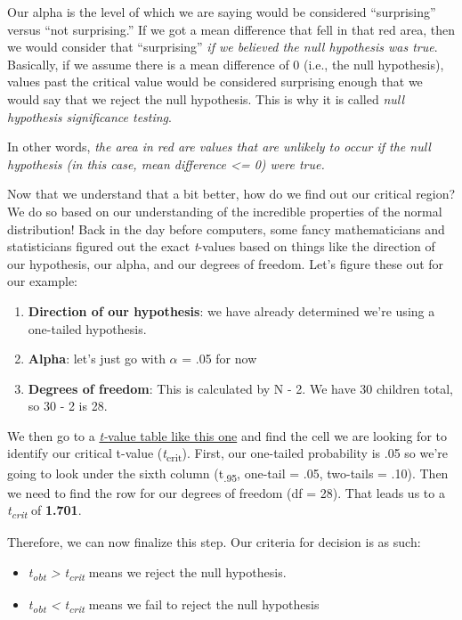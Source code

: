 \documentclass[
]{book}
\providecommand{\tightlist}{%
  \setlength{\itemsep}{0pt}\setlength{\parskip}{0pt}}
\begin{document}
Our alpha is the level of which we are saying would be considered ``surprising'' versus ``not surprising.'' If we got a mean difference that fell in that red area, then we would consider that ``surprising'' \emph{if we believed the null hypothesis was true}. Basically, if we assume there is a mean difference of 0 (i.e., the null hypothesis), values past the critical value would be considered surprising enough that we would say that we reject the null hypothesis. This is why it is called \emph{null hypothesis significance testing}.

In other words, \emph{the area in red are values that are unlikely to occur if the null hypothesis (in this case, mean difference \textless= 0) were true.}

Now that we understand that a bit better, how do we find out our critical region? We do so based on our understanding of the incredible properties of the normal distribution! Back in the day before computers, some fancy mathematicians and statisticians figured out the exact \emph{t}-values based on things like the direction of our hypothesis, our alpha, and our degrees of freedom. Let's figure these out for our example:

\begin{enumerate}
\def\labelenumi{\arabic{enumi}.}
\tightlist
\item
  \textbf{Direction of our hypothesis}: we have already determined we're using a one-tailed hypothesis.
\item
  \textbf{Alpha}: let's just go with \(\alpha\) = .05 for now
\item
  \textbf{Degrees of freedom}: This is calculated by N - 2. We have 30 children total, so 30 - 2 is 28.
\end{enumerate}

We then go to a \href{http://www.z-table.com/t-value-table.html}{\emph{t-}value table like this one} and find the cell we are looking for to identify our critical t-value (\emph{t}\textsubscript{crit}). First, our one-tailed probability is .05 so we're going to look under the sixth column (t\textsubscript{.95}, one-tail = .05, two-tails = .10). Then we need to find the row for our degrees of freedom (df = 28). That leads us to a \emph{t\textsubscript{crit}} of \textbf{1.701}.

Therefore, we can now finalize this step. Our criteria for decision is as such:

\begin{itemize}
\item
  \emph{t\textsubscript{obt} \textgreater{} t\textsubscript{crit}} means we reject the null hypothesis.
\item
  \emph{t\textsubscript{obt} \textless{} t\textsubscript{crit}} means we fail to reject the null hypothesis
\end{itemize}
\end{document}

